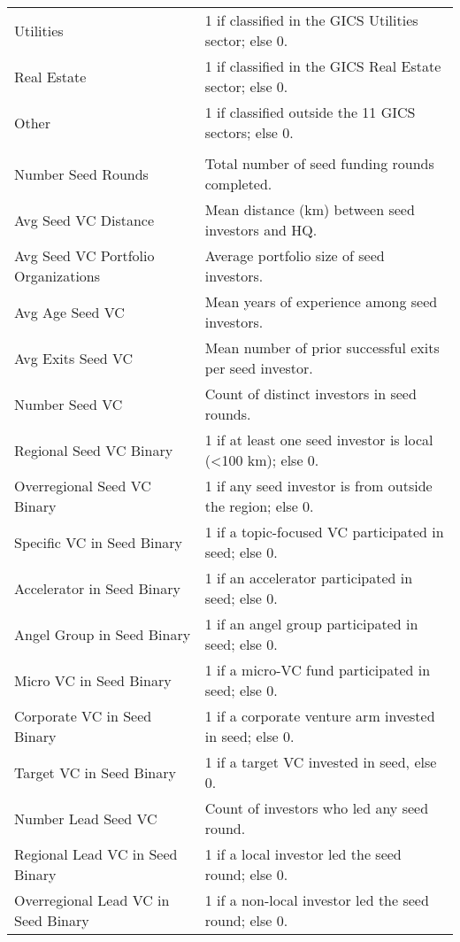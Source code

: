 {\begin{tabular}{p{} p{}}
Utilities & 1 if classified in the GICS Utilities sector; else 0. \\[0.4em]
Real Estate & 1 if classified in the GICS Real Estate sector; else 0. \\[0.4em]
Other & 1 if classified outside the 11 GICS sectors; else 0. \\[0.4em]
\addlinespace[0.5em]
\midrule
\multicolumn{2}{c}{\tiny\textsc{TREATMENT VARIABLES}} \\
\midrule
Number Seed Rounds & Total number of seed funding rounds completed. \\[0.4em]
Avg Seed VC Distance & Mean distance (km) between seed investors and HQ. \\[0.4em]
Avg Seed VC Portfolio Organizations & Average portfolio size of seed investors. \\[0.4em]
Avg Age Seed VC & Mean years of experience among seed investors. \\[0.4em]
Avg Exits Seed VC & Mean number of prior successful exits per seed investor. \\[0.4em]
Number Seed VC & Count of distinct investors in seed rounds. \\[0.4em]
Regional Seed VC Binary & 1 if at least one seed investor is local (<100 km); else 0. \\[0.4em]
Overregional Seed VC Binary & 1 if any seed investor is from outside the region; else 0. \\[0.4em]
Specific VC in Seed Binary & 1 if a topic-focused VC participated in seed; else 0. \\[0.4em]
Accelerator in Seed Binary & 1 if an accelerator participated in seed; else 0. \\[0.4em]
Angel Group in Seed Binary & 1 if an angel group participated in seed; else 0. \\[0.4em]
Micro VC in Seed Binary & 1 if a micro-VC fund participated in seed; else 0. \\[0.4em]
Corporate VC in Seed Binary & 1 if a corporate venture arm invested in seed; else 0. \\[0.4em]
Target VC in Seed Binary & 1 if a target VC invested in seed, else 0. \\[0.4em]
Number Lead Seed VC & Count of investors who led any seed round. \\[0.4em]
Regional Lead VC in Seed Binary & 1 if a local investor led the seed round; else 0. \\[0.4em]
Overregional Lead VC in Seed Binary & 1 if a non-local investor led the seed round; else 0. \\[0.4em]

\end{tabular}}

